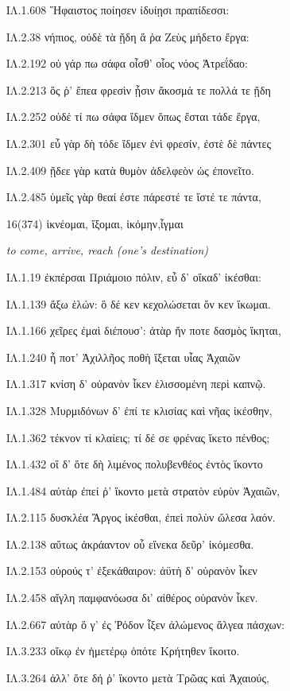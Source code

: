 \begin{enumerate}
{ΙΛ.1.608 Ἥφαιστος ποίησεν ἰδυίῃσι πραπίδεσσι:

ΙΛ.2.38 νήπιος, οὐδὲ τὰ ᾔδη ἅ ῥα Ζεὺς μήδετο ἔργα:

ΙΛ.2.192 οὐ γάρ πω σάφα οἶσθ' οἷος νόος Ἀτρεΐδαο:

ΙΛ.2.213 ὅς ῥ' ἔπεα φρεσὶν ᾗσιν ἄκοσμά τε πολλά τε ᾔδη

ΙΛ.2.252 οὐδέ τί πω σάφα ἴδμεν ὅπως ἔσται τάδε ἔργα,

ΙΛ.2.301 εὖ γὰρ δὴ τόδε ἴδμεν ἐνὶ φρεσίν, ἐστὲ δὲ πάντες

ΙΛ.2.409 ᾔδεε γὰρ κατὰ θυμὸν ἀδελφεὸν ὡς ἐπονεῖτο.

ΙΛ.2.485 ὑμεῖς γὰρ θεαί ἐστε πάρεστέ τε ἴστέ τε πάντα,

}

\clearpage
\item[\large 16(374)]{\large \g ἱκνέομαι, ἵξομαι, ἱκόμην,ἷγμαι   }

\hspace{0.2cm} \textit{to come, arrive, reach (one's destination)   }

{\g
ΙΛ.1.19 ἐκπέρσαι Πριάμοιο πόλιν, εὖ δ' οἴκαδ' ἱκέσθαι:

ΙΛ.1.139 ἄξω ἑλών: ὃ δέ κεν κεχολώσεται ὅν κεν ἵκωμαι.

ΙΛ.1.166 χεῖρες ἐμαὶ διέπουσ': ἀτὰρ ἤν ποτε δασμὸς ἵκηται,

ΙΛ.1.240 ἦ ποτ' Ἀχιλλῆος ποθὴ ἵξεται υἷας Ἀχαιῶν

ΙΛ.1.317 κνίση δ' οὐρανὸν ἷκεν ἑλισσομένη περὶ καπνῷ.

ΙΛ.1.328 Μυρμιδόνων δ' ἐπί τε κλισίας καὶ νῆας ἱκέσθην,

ΙΛ.1.362 τέκνον τί κλαίεις; τί δέ σε φρένας ἵκετο πένθος;

ΙΛ.1.432 οἳ δ' ὅτε δὴ λιμένος πολυβενθέος ἐντὸς ἵκοντο

ΙΛ.1.484 αὐτὰρ ἐπεί ῥ' ἵκοντο μετὰ στρατὸν εὐρὺν Ἀχαιῶν,

ΙΛ.2.115 δυσκλέα Ἄργος ἱκέσθαι, ἐπεὶ πολὺν ὤλεσα λαόν.

ΙΛ.2.138 αὔτως ἀκράαντον οὗ εἵνεκα δεῦρ' ἱκόμεσθα.

ΙΛ.2.153 οὐρούς τ' ἐξεκάθαιρον: ἀϋτὴ δ' οὐρανὸν ἷκεν

ΙΛ.2.458 αἴγλη παμφανόωσα δι' αἰθέρος οὐρανὸν ἷκεν.

ΙΛ.2.667 αὐτὰρ ὅ γ' ἐς Ῥόδον ἷξεν ἀλώμενος ἄλγεα πάσχων:

ΙΛ.3.233 οἴκῳ ἐν ἡμετέρῳ ὁπότε Κρήτηθεν ἵκοιτο.

ΙΛ.3.264 ἀλλ' ὅτε δή ῥ' ἵκοντο μετὰ Τρῶας καὶ Ἀχαιούς,

}
\end{enumerate}
